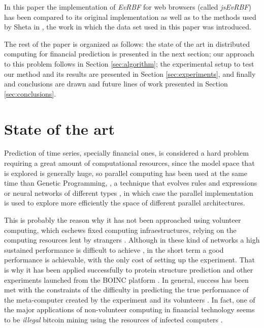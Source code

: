 \documentclass{article}
\begin{document}


In this paper the implementation of {\em EvRBF} for web browsers
(called {\em jsEvRBF}) has been compared to its original
implementation as well as to the methods used by Sheta in
\cite{Sheta2001}, the work in which the data set used in this paper
was introduced.

The rest of the paper is organized as follows: the state of the art in
distributed computing for financial prediction is presented in the
next section; our approach to this problem follows in Section
\ref{sec:algorithm}; the experimental setup to test our method and its
results are presented in Section \ref{sec:experiments}, and finally
and conclusions are drawn and future
lines of work presented in Section \ref{sec:conclusions}.

\section{State of the art}

Prediction of time series, specially financial ones, is considered a
hard problem requiring a great amount of computational resources,
since the model space that is explored is generally huge, so parallel
computing has been used at the same time than Genetic Programming,
\cite{santini2001genetic}, a technique that evolves rules and
expressions or neural networks of different types \cite{niska2004evolving,Mora2010,DBLP:conf/iwann/ArenasPRCJG09,RIIACastillo2008}, in which case
the parallel implementation is used to explore more efficiently the
space of different parallel architectures.

This is probably the reason why it has not been approached using
volunteer computing, which eschews fixed computing infraestructures,
relying on the computing resources lent by strangers
\cite{daniel:euromicro09,gecco07:workshop:dcor,DBLP:journals/corr/abs-0801-1210,DBLP:conf/gecco/MereloCGCRV16,baratloo1996charlotte,hwang2009determinants,web:BOINC}. Although
in these kind of networks a high sustained performance is difficult to
achieve \cite{DBLP:conf/lion/LaredoGFMACG11,DBLP:conf/gecco/MereloCGCRV16}, in the short term a
  good performance is achievable, with the only cost of setting up the
  experiment. That is why it has been applied successfully to protein
  structure prediction \cite{taufer2006predictor} and other
  experiments launched from the BOINC platform \cite{boinc_grid04}. In
  general, success has been met with the constraints of the difficulty
  in predicting the true performance of the meta-computer created by
  the experiment and its volunteers \cite{Merelo2016}. In fact, one of
  the major applications of non-volunteer computing in financial
  technology seems to be {\em illegal} bitcoin mining using the
  resources of infected computers \cite{plohmann2012case}.
\end{document}

